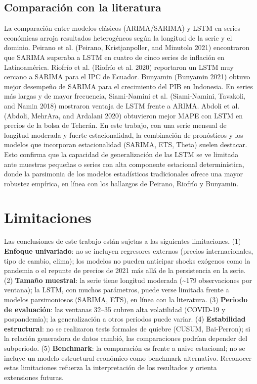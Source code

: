 \documentclass[
  12pt, a4paper, oneside]{article}
\begin{document}
\subsection{Comparación con la literatura}\label{comparaciuxf3n-con-la-literatura}

La comparación entre modelos clásicos (ARIMA/SARIMA) y LSTM en series económicas arroja resultados heterogéneos según la longitud de la serie y el dominio. Peirano et al. (Peirano, Kristjanpoller, and Minutolo 2021) encontraron que SARIMA superaba a LSTM en cuatro de cinco series de inflación en Latinoamérica. Riofrío et al. (Riofrío et al. 2020) reportaron un LSTM muy cercano a SARIMA para el IPC de Ecuador. Bunyamin (Bunyamin 2021) obtuvo mejor desempeño de SARIMA para el crecimiento del PIB en Indonesia. En series más largas y de mayor frecuencia, Siami-Namini et al. (Siami-Namini, Tavakoli, and Namin 2018) mostraron ventaja de LSTM frente a ARIMA. Abdoli et al. (Abdoli, MehrAra, and Ardalani 2020) obtuvieron mejor MAPE con LSTM en precios de la bolsa de Teherán. En este trabajo, con una serie mensual de longitud moderada y fuerte estacionalidad, la combinación de pronósticos y los modelos que incorporan estacionalidad (SARIMA, ETS, Theta) suelen destacar. Esto confirma que la capacidad de generalización de las LSTM se ve limitada ante muestras pequeñas o series con alta componente estacional determinística, donde la parsimonia de los modelos estadísticos tradicionales ofrece una mayor robustez empírica, en línea con los hallazgos de Peirano, Riofrío y Bunyamin.

\section{Limitaciones}\label{limitaciones}

Las conclusiones de este trabajo están sujetas a las siguientes limitaciones. (1) \textbf{Enfoque univariado}: no se incluyen regresores externos (precios internacionales, tipo de cambio, clima); los modelos no pueden anticipar shocks exógenos como la pandemia o el repunte de precios de 2021 más allá de la persistencia en la serie. (2) \textbf{Tamaño muestral}: la serie tiene longitud moderada (\textasciitilde179 observaciones por ventana); la LSTM, con muchos parámetros, puede verse limitada frente a modelos parsimoniosos (SARIMA, ETS), en línea con la literatura. (3) \textbf{Periodo de evaluación}: las ventanas 32--35 cubren alta volatilidad (COVID-19 y pospandemia); la generalización a otros periodos puede variar. (4) \textbf{Estabilidad estructural}: no se realizaron tests formales de quiebre (CUSUM, Bai-Perron); si la relación generadora de datos cambió, las comparaciones podrían depender del subperiodo. (5) \textbf{Benchmark}: la comparación es frente a naive estacional; no se incluye un modelo estructural económico como benchmark alternativo. Reconocer estas limitaciones refuerza la interpretación de los resultados y orienta extensiones futuras.
\end{document}
